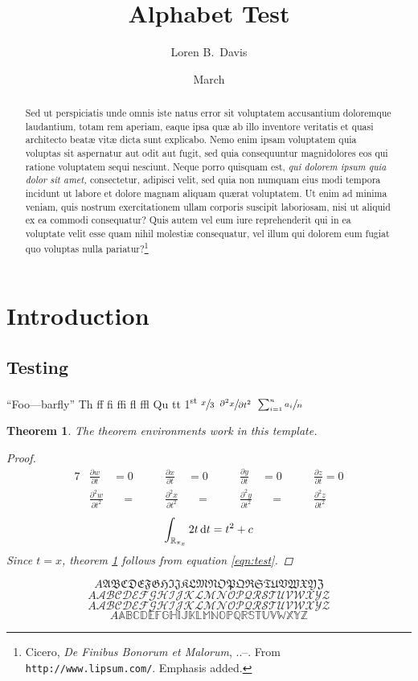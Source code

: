 \documentclass[10pt]{article}
\title{\titleface Alphabet Test}
\author{Loren B.\ Davis}
\date{\oldstylenums{11} March \oldstylenums{2012}}
\DeclareRobustCommand{\liningnums}[1]{#1}
\DeclareRobustCommand{\uppi}{\ensuremath\mathrm\pi}
\DeclareRobustCommand{\liningnums}[1]{\addfontfeature{RawFeature=-onum, Numbers=Lining} {#1}}
\numberwithin{equation}{subsection}
\theoremstyle{plain}%
\newtheorem{Theorem}{Theorem}
\theoremstyle{definition}
\theoremstyle{remark}
\DeclareRobustCommand{\dwrt}[1]{\ensuremath\mathop{\mathrm{d}{#1}}}
\begin{document}
\maketitle
\thispagestyle{empty}
\begin{abstract}
Sed ut perspiciatis unde omnis iste natus error sit voluptatem accusantium doloremque laudantium, totam rem aperiam, eaque ipsa quæ ab illo inventore veritatis et quasi architecto beatæ vitæ dicta sunt explicabo. Nemo enim ipsam voluptatem quia voluptas sit aspernatur aut odit aut fugit, sed quia consequuntur magnidolores eos qui ratione voluptatem sequi nesciunt. Neque porro quisquam est, \emph{qui dolorem ipsum quia dolor sit amet,} consectetur, adipisci velit, sed quia non numquam eius modi tempora incidunt ut labore et dolore magnam aliquam quærat voluptatem. Ut enim ad minima veniam, quis nostrum exercitationem ullam corporis suscipit laboriosam, nisi ut aliquid ex ea commodi consequatur? Quis autem vel eum iure reprehenderit qui in ea voluptate velit esse quam nihil molestiæ consequatur, vel illum qui dolorem eum fugiat quo voluptas nulla pariatur?\footnote{Cicero, \textit{De Finibus Bonorum et Malorum}, \textsection \liningnums{1}..--.  From \texttt{http://www.lipsum.com/}. Emphasis added.}
\end{abstract}

\section{Introduction}\label{sec:intro}
\subsection{Testing}
``Foo---barfly'' Th ff fi ffi fl ffl Qu tt 1\textsuperscript{st}  \(\sfrac{x}{3}\) \(\sfrac{\partial^2 x}{\partial t^2}\) \(\sfrac{\sum_{i=1}^n a_i}{n}\)

\begin{Theorem}\label{thm:test}
The theorem environments work in this template.

\begin{proof}
\begin{alignat*}{7}
&\frac{\partial w}{\partial t} &= 0 \qquad
&\frac{\partial x}{\partial t} &= 0 \qquad
&\frac{\partial y}{\partial t} &= 0 \qquad
&\frac{\partial z}{\partial t} = 0 \\
&\frac{\partial^2 w}{\partial t^2} &\quad = \quad
&\frac{\partial^2 x}{\partial t^2} &\quad = \quad
&\frac{\partial^2 y}{\partial t^2} &\quad = \quad
&\frac{\partial^2 z}{\partial t^2}
\end{alignat*}
\begin{equation}
\int_{\mathbb{R}_{\uppi_x}} 2t \dwrt{t} = t^2 + c \\ \label{eqn:test}
\end{equation}
Since \(t = x\), theorem \ref{thm:test} follows from equation \ref{eqn:test}.
\end{proof}
\end{Theorem}

\[A \mathfrak{ABCDEFGHIJKLMNOPQRSTUVWXYZ}\]
\[A \mathscr{ABCDEFGHIJKLMNOPQRSTUVWXYZ}\]
\[A \mathcal{ABCDEFGHIJKLMNOPQRSTUVWXYZ}\]
\[A \mathbb{ABCDEFGHIJKLMNOPQRSTUVWXYZ}\]
\end{document}
